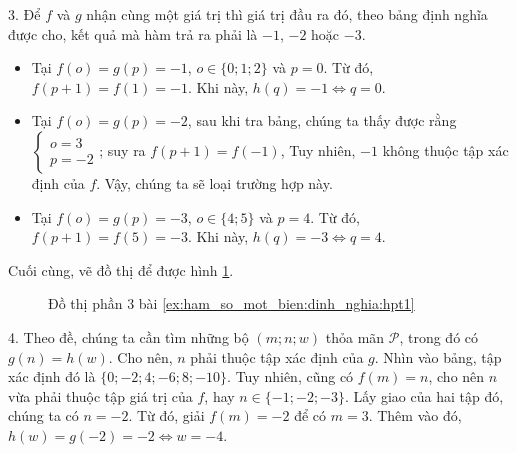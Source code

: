3. Để $f$ và $g$ nhận cùng một giá trị thì giá trị đầu ra đó, theo bảng định nghĩa được cho, kết quả mà hàm trả ra phải là $-1$, $-2$ hoặc $-3$.
\begin{itemize}
   \item Tại $f(o) = g(p) = -1$, $o \in \{0; 1; 2\}$ và $p = 0$. Từ đó, $f(p + 1) = f(1) = -1$. Khi này, $h(q) = -1 \iff q = 0$.
   \item Tại $f(o) = g(p) = -2$, sau khi tra bảng, chúng ta thấy được rằng $\begin{cases}o = 3\\p = -2\end{cases}$; suy ra $f(p + 1) = f(-1)$, Tuy nhiên, $-1$ không thuộc tập xác định của $f$. Vậy, chúng ta sẽ loại trường hợp này.
   \item Tại $f(o) = g(p) = -3$, $o \in \{4; 5\}$ và $p = 4$. Từ đó, $f(p + 1) = f(5) = -3$. Khi này, $h(q) = -3 \iff q = 4$.
\end{itemize}
Cuối cùng, vẽ đồ thị để được hình \ref{fig:hpt13}.

\begin{figure}[H]
   \centering
   \caption{Đồ thị phần 3 bài \ref{ex:ham_so_mot_bien:dinh_nghia:hpt1}}
   \label{fig:hpt13}
\end{figure}

4. Theo đề, chúng ta cần tìm những bộ $(m;n;w)$ thỏa mãn $\mathcal{P}$, trong đó có $g(n) = h(w)$. Cho nên, $n$ phải thuộc tập xác định của $g$. Nhìn vào bảng, tập xác định đó là $\{0; -2; 4; -6; 8; -10\}$. Tuy nhiên, cũng có $f(m) = n$, cho nên $n$ vừa phải thuộc tập giá trị của $f$, hay $n \in \{-1; -2; -3\}$. Lấy giao của hai tập đó, chúng ta có $n = -2$. Từ đó, giải $f(m) = -2$ để có $m = 3$. Thêm vào đó, $h(w) = g(-2) = -2 \iff w = -4$.

